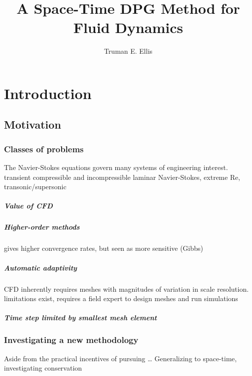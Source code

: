 \documentclass[12pt]{report}
\author{Truman E. Ellis}
\title{A Space-Time DPG Method for Fluid Dynamics}
\begin{document}
\titlepage

\tableofcontents   %



\chapter{Introduction}



\section{Motivation}


\subsection{Classes of problems}
The Navier-Stokes equations govern many systems of engineering interest.
transient compressible and incompressible laminar Navier-Stokes, extreme Re,
transonic/supersonic
\paragraph{Value of CFD}
\paragraph{Higher-order methods}
gives higher convergence rates, but seen as more sensitive (Gibbs)
\paragraph{Automatic adaptivity}
CFD inherently requires meshes with magnitudes of variation in scale
resolution.
limitations exist, requires a field expert to design meshes and run
simulations
\paragraph{Time step limited by smallest mesh element}

\subsection{Investigating a new methodology}
Aside from the practical incentives of pursuing \ldots
Generalizing to space-time, investigating conservation
\end{document}
